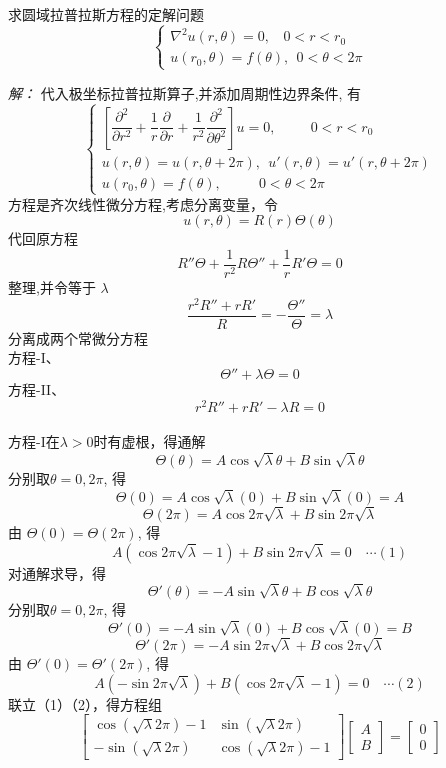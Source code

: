 \begin{example}
	求圆域拉普拉斯方程的定解问题 
	$$  \displaystyle  \left \{ 
	\begin{array}{cc}
		\nabla ^2 u(r,\theta) =0, ~~~~ 0 < r< r_0 \\
		u(r_0,\theta )=f(\theta ) ,~~ 0<\theta <2\pi 
	\end{array}
	\right. $$
\end{example}
\emph{解：}
代入极坐标拉普拉斯算子,并添加周期性边界条件, 有
 $$  \displaystyle  \left \{ 
	\begin{array}{c}
		\left[\dfrac{\partial^2  }{\partial r^2 } +\dfrac{1}{r } \dfrac{\partial  }{\partial r } +
			\dfrac{1}{r^2 } \dfrac{\partial ^2  }{\partial \theta ^2}
		\right] u  =0, \qquad ~~ 0 < r< r_0 \\
		u(r,\theta )=u(r,\theta+2\pi ), ~~u'(r,\theta )=u'(r,\theta+2\pi ) \\
		u(r_0,\theta )=f(\theta ) ,~~~~~~~~~~~~ 0<\theta <2\pi \qquad \qquad \qquad
	\end{array}
	\right. $$
	方程是齐次线性微分方程,考虑分离变量，令 $$\displaystyle  u(r,\theta)=R(r) \Theta(\theta)$$ 代回原方程 
    $$\displaystyle  R''\Theta +\dfrac{1}{r^2} R\Theta '' +\dfrac{1}{r}R'\Theta=0 $$ 
	整理,并令等于 $ \lambda  $ 
	$$\displaystyle  \dfrac{r^2R''+rR'}{R}=-\dfrac{\Theta '' }{\Theta} =\lambda $$ 
	分离成两个常微分方程 \\
	方程-I、 $$\displaystyle 	\Theta '' + \lambda \Theta =0 $$   
	方程-II、$$\displaystyle  r^2 R'' +r R' -\lambda R =0 $$  	
	~~\\ 
	方程-I在$ \lambda >0 $时有虚根，得通解 
	$$\displaystyle  \Theta(\theta)=A\cos \sqrt{\lambda } \theta+B\sin \sqrt{\lambda }\theta $$ 
	分别取$ \theta =0, 2\pi $, 得 
	$$\displaystyle  \Theta(0)=A\cos \sqrt{\lambda } (0)+B\sin \sqrt{\lambda }(0) = A $$ 
	$$\displaystyle  \Theta(2\pi)=A\cos 2\pi\sqrt{\lambda }+B\sin 2\pi\sqrt{\lambda }$$ 
	由 $ \Theta(0) = \Theta(2\pi) $, 得
	$$ A(\cos 2\pi\sqrt{\lambda }-1)+B\sin 2\pi\sqrt{\lambda } =0 \quad \cdots (1)$$
	对通解求导，得
  $$\displaystyle  \Theta'(\theta)=-A\sin \sqrt{\lambda } \theta+B\cos \sqrt{\lambda }\theta $$ 
分别取$ \theta =0, 2\pi $, 得 
	$$\displaystyle  \Theta'(0)=-A\sin \sqrt{\lambda } (0)+B\cos \sqrt{\lambda }(0) = B $$ 
	$$\displaystyle  \Theta'(2\pi)=-A\sin 2\pi\sqrt{\lambda }+B\cos 2\pi\sqrt{\lambda }$$ 
	由 $ \Theta'(0) = \Theta'(2\pi) $, 得
	$$ A(-\sin 2\pi\sqrt{\lambda })+B(\cos 2\pi\sqrt{\lambda }-1) =0 \quad \cdots (2)$$
	联立（1）（2），得方程组
	$$ \left[
	\begin{array}{lll}
		\cos (\sqrt {\lambda} 2\pi )-1  & \sin (\sqrt {\lambda} 2\pi )\\
		-\sin (\sqrt {\lambda} 2\pi ) & \cos (\sqrt {\lambda} 2\pi )-1
	\end{array} \right] 
	\left[
	\begin{array}{lll}
		A\\
		B
	\end{array} \right] 
	=
	\left[
	\begin{array}{lll}
		0\\
		0
	\end{array} \right]
	$$
